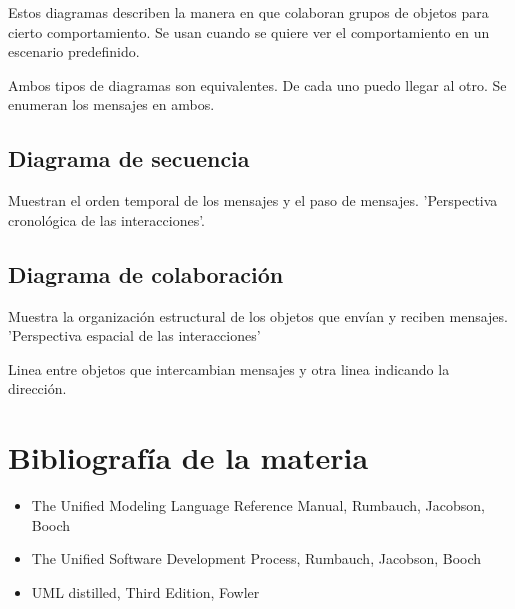 \documentclass[titlepage,a4paper]{article}
\begin{document}
Estos diagramas describen la manera en que colaboran grupos de objetos para cierto comportamiento. Se usan cuando se quiere ver el comportamiento en un escenario predefinido.

Ambos tipos de diagramas son equivalentes. De cada uno puedo llegar al otro. Se enumeran los mensajes en ambos.

\subsection{Diagrama de secuencia}
Muestran el orden temporal de los mensajes y el paso de mensajes. 'Perspectiva cronológica de las interacciones'.


\subsection{Diagrama de colaboración}
Muestra la organización estructural de los objetos que envían y reciben mensajes. 'Perspectiva espacial de las interacciones'

Linea entre objetos que intercambian mensajes y otra linea indicando la dirección.




\newpage

\section{Bibliografía de la materia}

\begin{itemize}
    \item The Unified Modeling Language Reference Manual, Rumbauch, Jacobson, Booch
    \item The Unified Software Development Process, Rumbauch, Jacobson, Booch
    \item UML distilled, Third Edition, Fowler
\end{itemize}
\end{document}
